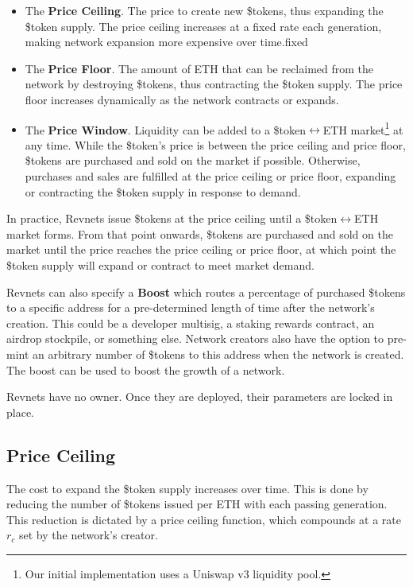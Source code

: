 \documentclass{article}
\begin{document}
\begin{itemize}
  \item The \textbf{Price Ceiling}. The price to create new \$tokens, thus expanding the \$token supply. The price ceiling increases at a fixed rate each generation, making network expansion more expensive over time.fixed
  \item The \textbf{Price Floor}. The amount of ETH that can be reclaimed from the network by destroying \$tokens, thus contracting the \$token supply. The price floor increases dynamically as the network contracts or expands.
  \item The \textbf{Price Window}. Liquidity can be added to a \$token$\leftrightarrow$ETH market\footnote{Our initial implementation uses a Uniswap v3 liquidity pool.} at any time. While the \$token's price is between the price ceiling and price floor, \$tokens are purchased and sold on the market if possible. Otherwise, purchases and sales are fulfilled at the price ceiling or price floor, expanding or contracting the \$token supply in response to demand.
\end{itemize}

In practice, Revnets issue \$tokens at the price ceiling until a \$token$\leftrightarrow$ETH market forms. From that point onwards, \$tokens are purchased and sold on the market until the price reaches the price ceiling or price floor, at which point the \$token supply will expand or contract to meet market demand.

Revnets can also specify a \textbf{Boost} which routes a percentage of purchased \$tokens to a specific address for a pre-determined length of time after the network's creation. This could be a developer multisig, a staking rewards contract, an airdrop stockpile, or something else. Network creators also have the option to pre-mint an arbitrary number of \$tokens to this address when the network is created. The boost can be used to boost the growth of a network.

Revnets have no owner. Once they are deployed, their parameters are locked in place.

\subsection{Price Ceiling}

The cost to expand the \$token supply increases over time. This is done by reducing the number of \$tokens issued per ETH with each passing generation. This reduction is dictated by a price ceiling function, which compounds at a rate $r_c$ set by the network's creator.
\end{document}
